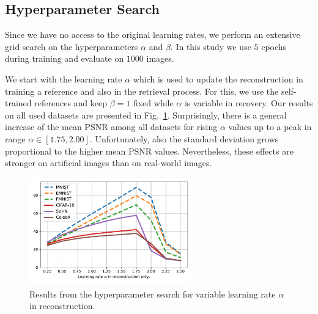 \subsection{Hyperparameter Search}
\label{sec:hyperp-search}
Since we have no access to the original learning rates, we perform an extensive
grid search on the hyperparameters $\alpha$ and $\beta$. In this study we use $5$ epochs during training and evaluate on $1000$ images.

We start with the learning rate $\alpha$ which is used to update the
reconstruction in training a reference and also in the retrieval
process. For this, we use the self-trained references and keep $\beta = 1$
fixed while $\alpha$ is variable in recovery. Our results on all used datasets are presented in
Fig.~\ref{hyperparam-all}.
Surprisingly, there is a general increase
of the mean PSNR among all datasets for rising $\alpha$ values up to a
peak in range $\alpha \in [1.75, 2.00]$. %
Unfortunately, also the standard deviation grows proportional to the higher mean PSNR
values. Nevertheless, these effects are stronger on artificial images
than on real-world images.

\begin{figure}
	\centering
	\includegraphics[width=7cm,trim= 10 20 10 0]{data/lr-alpha-rec-all.pdf}
	\caption{Results from the hyperparameter search for variable learning rate $\alpha$ in reconstruction.}
	\label{hyperparam-all}
\end{figure}

